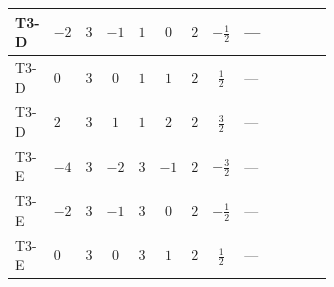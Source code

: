 \documentclass[8pt]{article}
\begin{document}
\begin{landscape}
\begin{longtable}{@{}llcccccc >{\raggedright\arraybackslash}p{0.21\linewidth} >{\raggedright\arraybackslash}p{0.21\linewidth} >{\raggedright\arraybackslash}p{0.21\linewidth}@{}}
\midrule
T3-D & $-2$ & $3$ & $-1$ & $1$ & $0$ & $2$ & $-\frac{1}{2}$ & --- & \scriptsize\adjustbox{max width=\linewidth}{$\begin{gathered} -\frac{21 {g_2}^2 {\lambda_5}}{2}\end{gathered}$} & \scriptsize\adjustbox{max width=\linewidth}{$\begin{gathered} -\frac{9 {g_1}^2 {\lambda_5}}{2}\end{gathered}$} \\
\midrule
T3-D & $0$ & $3$ & $0$ & $1$ & $1$ & $2$ & $\frac{1}{2}$ & --- & \scriptsize\adjustbox{max width=\linewidth}{$\begin{gathered} -\frac{21 {g_2}^2 {\lambda_5}}{2}\end{gathered}$} & \scriptsize\adjustbox{max width=\linewidth}{$\begin{gathered} -\frac{9 {g_1}^2 {\lambda_5}}{2}\end{gathered}$} \\
\midrule
T3-D & $2$ & $3$ & $1$ & $1$ & $2$ & $2$ & $\frac{3}{2}$ & --- & \scriptsize\adjustbox{max width=\linewidth}{$\begin{gathered} -\frac{21 {g_2}^2 {\lambda_5}}{2}\end{gathered}$} & \scriptsize\adjustbox{max width=\linewidth}{$\begin{gathered} -\frac{33 {g_1}^2 {\lambda_5}}{2}\end{gathered}$} \\
\midrule
T3-E & $-4$ & $3$ & $-2$ & $3$ & $-1$ & $2$ & $-\frac{3}{2}$ & --- & \scriptsize\adjustbox{max width=\linewidth}{$\begin{gathered} -\frac{33 {g_2}^2 {\lambda_5}}{2}\end{gathered}$} & \scriptsize\adjustbox{max width=\linewidth}{$\begin{gathered} -\frac{33 {g_1}^2 {\lambda_5}}{2}\end{gathered}$} \\
\midrule
T3-E & $-2$ & $3$ & $-1$ & $3$ & $0$ & $2$ & $-\frac{1}{2}$ & --- & \scriptsize\adjustbox{max width=\linewidth}{$\begin{gathered} -\frac{33 {g_2}^2 {\lambda_5}}{2}\end{gathered}$} & \scriptsize\adjustbox{max width=\linewidth}{$\begin{gathered} -\frac{9 {g_1}^2 {\lambda_5}}{2}\end{gathered}$} \\
\midrule
T3-E & $0$ & $3$ & $0$ & $3$ & $1$ & $2$ & $\frac{1}{2}$ & --- & \scriptsize\adjustbox{max width=\linewidth}{$\begin{gathered} -\frac{33 {g_2}^2 {\lambda_5}}{2}\end{gathered}$} & \scriptsize\adjustbox{max width=\linewidth}{$\begin{gathered} -\frac{9 {g_1}^2 {\lambda_5}}{2}\end{gathered}$} \\

\end{longtable}
\end{landscape}
\end{document}
